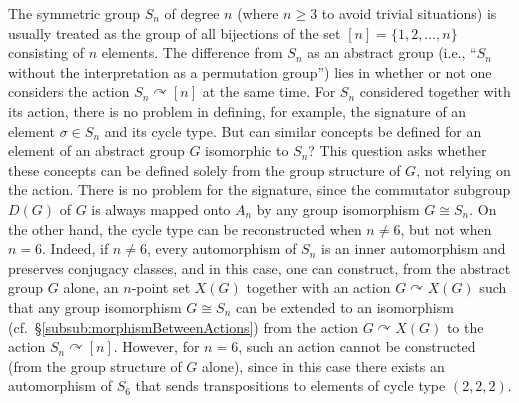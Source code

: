 \documentclass[12pt, reqno, a4paper]{amsart}
\def\acton{\curvearrowright} %
\begin{document}
\begin{exa}\label{exa: symmetricGroup} 
The symmetric group $S_n$ of degree $n$ (where $n\geq 3$ to avoid trivial situations) is usually treated as the group of all bijections of the set $[n]=\{1,2,\ldots,n\}$ consisting of $n$ elements.
The difference from $S_n$ as an abstract group (i.e., ``$S_n$ without the interpretation as a permutation group'') lies in whether or not one considers the action $S_n\acton [n]$ at the same time.
For $S_n$ considered together with its action, there is no problem in defining, for example, the signature of an element $\sigma\in S_n$ and its cycle type.
But can similar concepts be defined for an element of an abstract group $G$ isomorphic to $S_n$?
This question asks whether these concepts can be defined solely from the group structure of $G$, not relying on the action.
There is no problem for the signature, since the commutator subgroup $D(G)$ of $G$ is always mapped onto $A_n$ by any group isomorphism $G\cong S_n$.
On the other hand, the cycle type can be reconstructed when $n\neq 6$, but not when $n=6$.
Indeed, if $n\neq 6$, every automorphism of $S_n$ is an inner automorphism and preserves conjugacy classes, and in this case, one can construct, from the abstract group $G$ alone, an $n$-point set $X(G)$ together with an action $G\acton X(G)$ such that any group isomorphism $G\cong S_n$ can be extended to an isomorphism (cf.\ \S\ref{subsub:morphismBetweenActions}) from the action $G\acton X(G)$ to the action $S_n\acton [n]$.
However, for $n=6$, such an action cannot be constructed (from the group structure of $G$ alone), since in this case there exists an automorphism of $S_6$ that sends transpositions to elements of cycle type $(2,2,2)$.
\end{exa}
\end{document}
